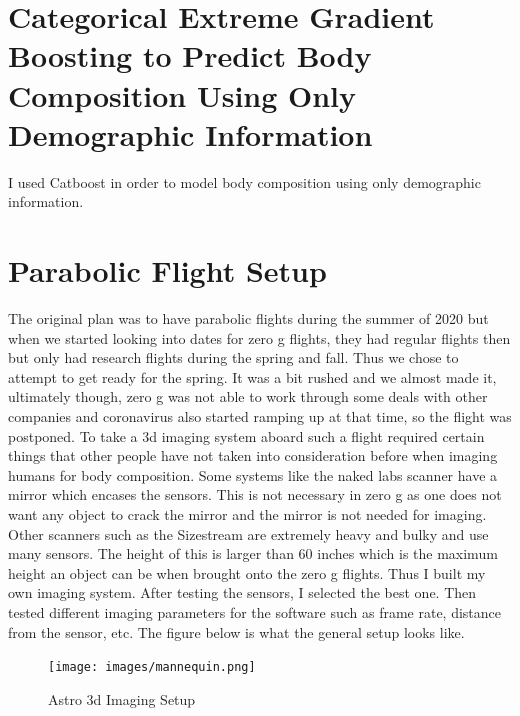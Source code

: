 \section{Categorical Extreme Gradient Boosting to Predict Body Composition Using Only Demographic Information}
I used Catboost \cite{DBLP:journals/corr/DorogushGGKPV17} in order to model body composition using only demographic information. 

\section{Parabolic Flight Setup}
The original plan was to have parabolic flights during the summer of 2020 but when we started looking into dates for zero g flights, they had regular flights then but only had research flights during the spring and fall. Thus we chose to attempt to get ready for the spring. It was a bit rushed and we almost made it, ultimately though, zero g was not able to work through some deals with other companies and coronavirus also started ramping up at that time, so the flight was postponed.
To take a 3d imaging system aboard such a flight required certain things that other people have not taken into consideration before when imaging humans for body composition. Some systems like the naked labs scanner have a mirror which encases the sensors. This is not necessary in zero g as one does not want any object to crack the mirror and the mirror is not needed for imaging. Other scanners such as the Sizestream are extremely heavy and bulky and use many sensors. The height of this is larger than 60 inches which is the maximum height an object can be when brought onto the zero g flights. Thus I built my own imaging system. After testing the sensors, I selected the best one. Then tested different imaging parameters for the software such as frame rate, distance from the sensor, etc.
The figure below is what the general setup looks like.
\begin{figure}[!htb]
	\caption{Astro 3d Imaging Setup}
	\centering
	\texttt{[image: images/mannequin.png]}
\end{figure}

